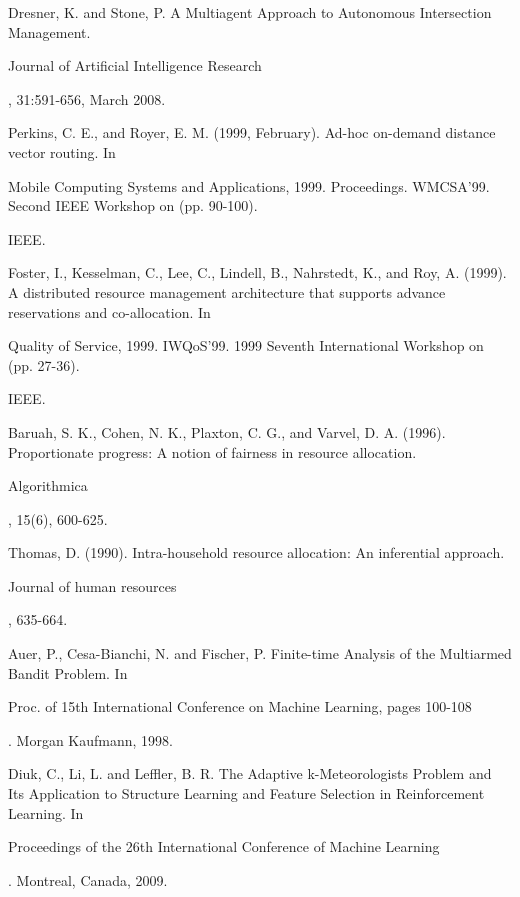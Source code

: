 \documentclass[conference]{IEEEtran}
\begin{document}
\begin{thebibliography}{1}
Dresner, K. and Stone, P. A Multiagent Approach to Autonomous Intersection Management. \begin{em}Journal of Artificial Intelligence Research\end{em}, 31:591-656, March 2008.

Perkins, C. E., and Royer, E. M. (1999, February). Ad-hoc on-demand distance vector routing. In \begin{em}Mobile Computing Systems and Applications, 1999. Proceedings. WMCSA'99. Second IEEE Workshop on (pp. 90-100).\end{em} IEEE.

Foster, I., Kesselman, C., Lee, C., Lindell, B., Nahrstedt, K., and Roy, A. (1999). A distributed resource management architecture that supports advance reservations and co-allocation. In \begin{em}Quality of Service, 1999. IWQoS'99. 1999 Seventh International Workshop on (pp. 27-36).\end{em} IEEE.

Baruah, S. K., Cohen, N. K., Plaxton, C. G., and Varvel, D. A. (1996). Proportionate progress: A notion of fairness in resource allocation. \begin{em}Algorithmica\end{em}, 15(6), 600-625.

Thomas, D. (1990). Intra-household resource allocation: An inferential approach. \begin{em}Journal of human resources\end{em}, 635-664.

Auer, P., Cesa-Bianchi, N. and Fischer, P. Finite-time Analysis of the Multiarmed Bandit Problem. In \begin{em} Proc. of 15th International Conference on Machine Learning, pages 100-108\end{em}. Morgan Kaufmann, 1998.

Diuk, C., Li, L. and Leffler, B. R. The Adaptive k-Meteorologists Problem and Its Application to Structure Learning and Feature Selection in Reinforcement Learning. In \begin{em} Proceedings of the 26th International Conference of Machine Learning\end{em}. Montreal, Canada, 2009. 

\end{thebibliography}




\end{document}
